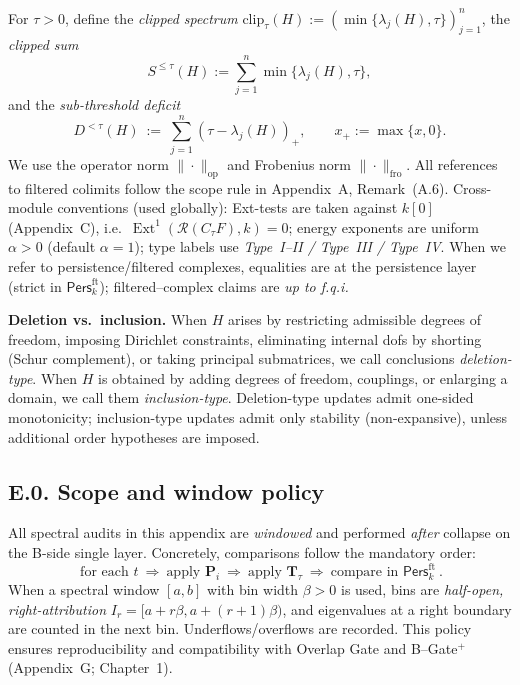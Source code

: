 \documentclass[11pt]{article}
\numberwithin{equation}{section}
\theoremstyle{plain}
\theoremstyle{definition}
\theoremstyle{remark}
\DeclareMathOperator{\Ext}{Ext}
\newcommand{\Pers}{\mathsf{Pers}}
\theoremstyle{plain}
\theoremstyle{definition}
\numberwithin{equation}{section}
\theoremstyle{definition}
\numberwithin{equation}{section}
\theoremstyle{plain}
\theoremstyle{definition}
\theoremstyle{remark}
\begin{document}

For \(\tau>0\), define the \emph{clipped spectrum}
\(\mathrm{clip}_\tau(H):=(\min\{\lambda_j(H),\tau\})_{j=1}^n\), the \emph{clipped sum}
\[
S^{\le \tau}(H):=\sum_{j=1}^n \min\{\lambda_j(H),\tau\},
\]
and the \emph{sub-threshold deficit}
\[
D^{<\tau}(H)\ :=\ \sum_{j=1}^n (\tau-\lambda_j(H))_+,\qquad x_+:=\max\{x,0\}.
\]
We use the operator norm \(\|\cdot\|_{\mathrm{op}}\) and Frobenius norm \(\|\cdot\|_{\mathrm{fro}}\).
All references to filtered colimits follow the scope rule in Appendix~A, Remark~(A.6).
Cross-module conventions (used globally): Ext-tests are taken against \(k[0]\) (Appendix~C), i.e.\ \(\Ext^1(\mathcal{R}(C_\tau F),k)=0\); energy exponents are uniform \(\alpha>0\) (default \(\alpha=1\)); type labels use \emph{Type~I--II / Type~III / Type~IV}.
When we refer to persistence/filtered complexes, equalities are at the persistence layer (strict in \(\Pers^{\mathrm{ft}}_k\)); filtered–complex claims are \emph{up to f.q.i.}

\medskip
\noindent\textbf{Deletion vs.\ inclusion.}
When \(H\) arises by restricting admissible degrees of freedom, imposing Dirichlet constraints, eliminating internal dofs by shorting (Schur complement), or taking principal submatrices, we call conclusions \emph{deletion-type}.
When \(H\) is obtained by adding degrees of freedom, couplings, or enlarging a domain, we call them \emph{inclusion-type}.
Deletion-type updates admit one-sided monotonicity; inclusion-type updates admit only stability (non-expansive), unless additional order hypotheses are imposed.

\subsection*{E.0. Scope and window policy}

All spectral audits in this appendix are \emph{windowed} and performed \emph{after} collapse on the B-side single layer.
Concretely, comparisons follow the mandatory order:
\[
\boxed{\ \text{for each } t\ \Longrightarrow\ \text{apply } \mathbf{P}_i \ \Longrightarrow\ \text{apply } \mathbf{T}_\tau \ \Longrightarrow\ \text{compare in }\Pers^{\mathrm{ft}}_k\ }.
\]
When a spectral window \([a,b]\) with bin width \(\beta>0\) is used, bins are \emph{half-open, right-attribution}
\(I_r=[a+r\beta,a+(r+1)\beta)\), and eigenvalues at a right boundary are counted in the next bin.
Underflows/overflows are recorded.
This policy ensures reproducibility and compatibility with Overlap Gate and B–Gate\(^{+}\) (Appendix~G; Chapter~1).
\end{document}
